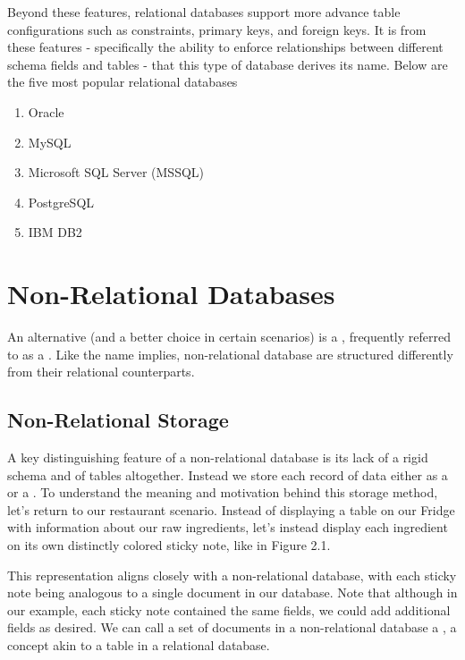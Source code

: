 Beyond these features, relational databases support more advance table configurations such as constraints, primary keys, and foreign keys. It is from these features - specifically the ability to enforce relationships between different schema fields and tables - that this type of database derives its name. Below are the five most popular relational databases

\begin{enumerate}
    \item Oracle
    \item MySQL
    \item Microsoft SQL Server (MSSQL)
    \item PostgreSQL
    \item IBM DB2
\end{enumerate}

\section{Non-Relational Databases}

An alternative (and a better choice in certain scenarios) is a , frequently referred to as a . Like the name implies, non-relational database are structured differently from their relational counterparts. 

\subsection*{Non-Relational Storage}

A key distinguishing feature of a non-relational database is its lack of a rigid schema and of tables altogether. Instead we store each record of data either as a  or a . To understand the meaning and motivation behind this storage method, let's return to our restaurant scenario. Instead of displaying a table on our Fridge with information about our raw ingredients, let's instead display each ingredient on its own distinctly colored sticky note, like in Figure 2.1.


This representation aligns closely with a non-relational database, with each sticky note being analogous to a single document in our database. Note that although in our example, each sticky note contained the same fields, we could add additional fields as desired. We can call a set of documents in a non-relational database a , a concept akin to a table in a relational database.

